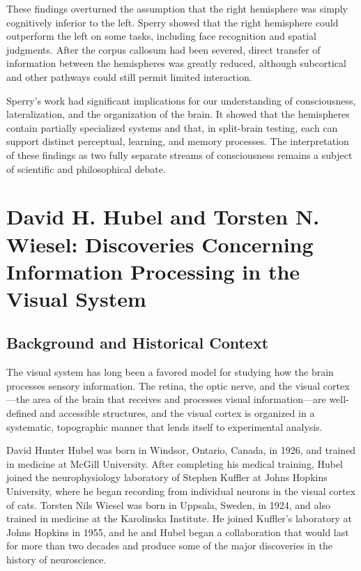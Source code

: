 These findings overturned the assumption that the right hemisphere was simply cognitively inferior to the left. Sperry showed that the right hemisphere could outperform the left on some tasks, including face recognition and spatial judgments. After the corpus callosum had been severed, direct transfer of information between the hemispheres was greatly reduced, although subcortical and other pathways could still permit limited interaction.

Sperry's work had significant implications for our understanding of consciousness, lateralization, and the organization of the brain. It showed that the hemispheres contain partially specialized systems and that, in split-brain testing, each can support distinct perceptual, learning, and memory processes. The interpretation of these findings as two fully separate streams of consciousness remains a subject of scientific and philosophical debate.

\section[David H. Hubel and Torsten N.]{David H. Hubel and Torsten N. Wiesel: Discoveries Concerning Information Processing in the Visual System}

\subsection{Background and Historical Context}

The visual system has long been a favored model for studying how the brain processes sensory information. The retina, the optic nerve, and the visual cortex---the area of the brain that receives and processes visual information---are well-defined and accessible structures, and the visual cortex is organized in a systematic, topographic manner that lends itself to experimental analysis.

David Hunter Hubel was born in Windsor, Ontario, Canada, in 1926, and trained in medicine at McGill University. After completing his medical training, Hubel joined the neurophysiology laboratory of Stephen Kuffler at Johns Hopkins University, where he began recording from individual neurons in the visual cortex of cats. Torsten Nils Wiesel was born in Uppsala, Sweden, in 1924, and also trained in medicine at the Karolinska Institute. He joined Kuffler's laboratory at Johns Hopkins in 1955, and he and Hubel began a collaboration that would last for more than two decades and produce some of the major discoveries in the history of neuroscience.

